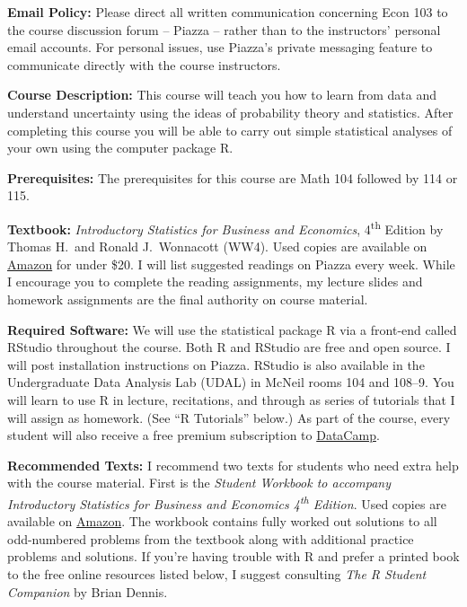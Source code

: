\documentclass[11pt, letterpaper]{article}
\begin{document}
\medskip

\noindent \textbf{Email Policy:}
Please direct all written communication concerning Econ 103 to the course discussion forum -- Piazza -- rather than to the instructors' personal email accounts.
For personal issues, use Piazza's private messaging feature to communicate directly with the course instructors. 

\medskip



\noindent \textbf{Course Description:} 
This course will teach you how to learn from data and understand uncertainty using the ideas of probability theory and statistics. 
After completing this course you will be able to carry out simple statistical analyses of your own using the computer package R.


\medskip


\noindent \textbf{Prerequisites:} 
The prerequisites for this course are Math 104 followed by 114 or 115. 



\medskip

\noindent \textbf{Textbook:} 
\emph{Introductory Statistics for Business and Economics}, 4\textsuperscript{th} Edition by Thomas H.\ and Ronald J.\ Wonnacott (WW4). 
Used copies are available on \href{http://tinyurl.com/ECON103-2013A}{Amazon} for under \$20.
I will list suggested readings on Piazza every week. 
While I encourage you to complete the reading assignments, my lecture slides and homework assignments are the final authority on course material.

\medskip


\noindent \textbf{Required Software:} 
We will use the statistical package R via a front-end called RStudio throughout the course. 
Both R and RStudio are free and open source. 
I will post installation instructions on Piazza.
RStudio is also available in the Undergraduate Data Analysis Lab (UDAL) in McNeil rooms 104 and 108--9. 
You will learn to use R in lecture, recitations, and through as series of tutorials that I will assign as homework. (See ``R Tutorials'' below.)  
As part of the course, every student will also receive a free premium subscription to \href{https://datacamp.com}{DataCamp}.

\medskip

\noindent \textbf{Recommended Texts:} 
I recommend two texts for students who need extra help with the course material. 
First is the \emph{Student Workbook to accompany Introductory Statistics for Business and Economics 4\textsuperscript{th} Edition}. 
Used copies are available on \href{http://www.amazon.com/gp/offer-listing/0471508993/sr=/qid=/ref=olp_page_2?ie=UTF8&colid=&coliid=&condition=all&me=&qid=&shipPromoFilter=0&sort=sip&sr=&startIndex=10}{Amazon}. 
The workbook contains fully worked out solutions to all odd-numbered problems from the textbook along with additional practice problems and solutions.
If you're having trouble with R and prefer a printed book to the free online resources listed below, I suggest consulting \emph{The R Student Companion} by Brian Dennis.
\end{document}

